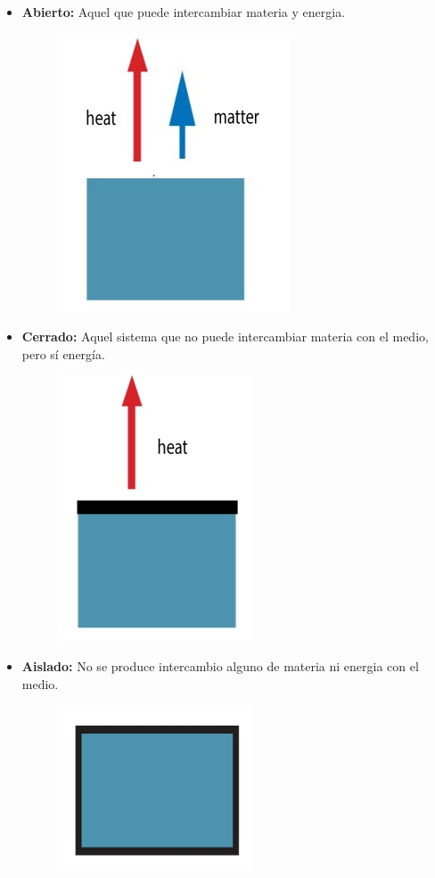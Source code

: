 \documentclass[12pt,twocolumn,a4paper]{report}
\begin{document}
	\begin{itemize}
	\item{\textbf{Abierto:}	Aquel que puede intercambiar materia y energia.
	\begin{figure}[H]
	\centering	
	\includegraphics[scale=0.3]{graficos/tiposdesistemas1.jpeg}	
\end{figure}}	
	\item{\textbf{Cerrado:} Aquel sistema que no puede intercambiar materia con el medio, pero sí energía.
	\begin{figure}[H]
	\centering	
	\includegraphics[scale=0.32]{graficos/tiposdesistemas2.jpeg}	
\end{figure}}	
	\item{\textbf{Aislado:} No se produce intercambio alguno de materia ni energia con el medio.
	\begin{figure}[H]
	\centering	
	\includegraphics[scale=0.3]{graficos/tiposdesistemas3.jpeg}	
\end{figure}}	
	\end{itemize}
\end{document}
